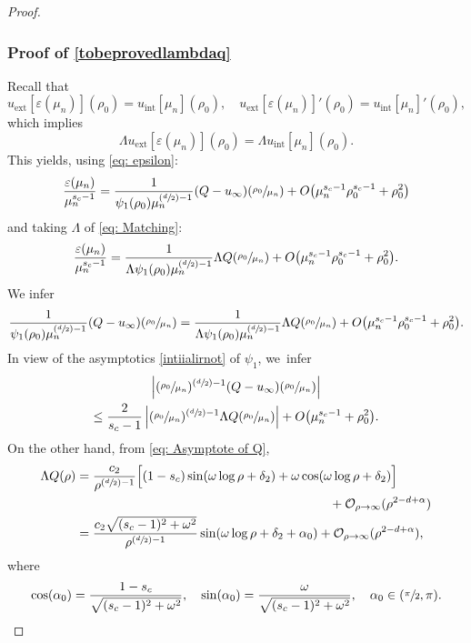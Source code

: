 \documentclass[10pt]{amsart}
\newcommand{\Psfrac}[2]{(\sfrac{#1}{#2})}
\theoremstyle{plain}
\theoremstyle{definition}
\DeclareMathOperator{\exterior}{ext}
\DeclareMathOperator{\interior}{int}
\begin{document}
\begin{proof}
\subsubsection*{Proof of \eqref{tobeprovedlambdaq}}
Recall that
\[
u_{\exterior}[\varepsilon(\mu_n)](\rho_0) = u_{\interior}[\mu_n](\rho_0),\quad u_{\exterior}[\varepsilon(\mu_n)]'(\rho_0) = u_{\interior}[\mu_n]'(\rho_0),
\]
which implies
\[
\Lambda u_{\exterior}[\varepsilon(\mu_n)](\rho_0) = \Lambda u_{\interior}[\mu_n](\rho_0).
\]
This yields, using \eqref{eq: epsilon}:
\[
\frac{\varepsilon(\mu_n)}{\mu_n^{s_c-1}} = \frac{1}{\psi_1(\rho_0)\mu_n^{\Psfrac{d}{2}-1}}(Q-u_\infty)(\sfrac{\rho_0}{\mu_n}) + O\big(\mu_n^{s_c-1}\rho_0^{s_c-1}+\rho_0^2\big)
\]
and taking $\Lambda$ of \eqref{eq: Matching}:
\[
\frac{\varepsilon(\mu_n)}{\mu_n^{s_c-1}} = \frac{1}{\Lambda\psi_1(\rho_0)\mu_n^{\Psfrac{d}{2}-1}}\Lambda Q(\sfrac{\rho_0}{\mu_n}) + O\big(\mu_n^{s_c-1} \rho_0^{s_c-1}+\rho_0^2\big).
\]
We infer
\[
\frac{1}{\psi_1(\rho_0)\mu_n^{\Psfrac{d}{2}-1}}(Q-u_\infty)(\sfrac{\rho_0}{\mu_n}) = \frac{1}{\Lambda\psi_1(\rho_0)\mu_n^{\Psfrac{d}{2}-1}}\Lambda Q(\sfrac{\rho_0}{\mu_n})+ O\big(\mu_n^{s_c-1} \rho_0^{s_c-1}+\rho_0^2\big).
\]
In view of the asymptotics \eqref{intiialirnot} of $\psi_1$, we~infer
\begin{multline}
\label{eq:usefulboundtocountnumberofzeros}
\left|(\sfrac{\rho_0}{\mu_n})^{\Psfrac{d}{2}-1}(Q-u_\infty)(\sfrac{\rho_0}{\mu_n})\right|\\
\leq \frac{2}{s_c-1}\left|(\sfrac{\rho_0}{\mu_n})^{\Psfrac{d}{2}-1}\Lambda Q(\sfrac{\rho_0}{\mu_n})\right|+ O\big(\mu_n^{s_c-1}+\rho_0^2\big).
\end{multline}
On the other hand, from \eqref{eq: Asymptote of Q},
\begin{equation}
\label{eq:equationwithtwostars}
\begin{aligned}
\Lambda Q(\rho)&=\frac{c_2}{ \rho^{\Psfrac{d}{2}-1}}\Big[(1-s_c)\sin(\omega\log\rho+\delta_2)+\omega\cos (\omega\log\rho+\delta_2)\Big]\\
&\hspace*{7cm}+\mathcal O_{\rho\to\infty}(\rho^{2-d+\alpha})\\
&=\frac{c_2\sqrt{(s_c-1)^2+\omega^2}}{ \rho^{\Psfrac{d}{2}-1}}\sin(\omega\log\rho+\delta_2+\alpha_0)+\mathcal O_{\rho\to\infty}(\rho^{2-d+\alpha}),
\end{aligned}
\end{equation}
where
\[
\cos(\alpha_0)=\frac{1-s_c}{\sqrt{(s_c-1)^2+\omega^2}},\quad \sin(\alpha_0)=\frac{\omega}{\sqrt{(s_c-1)^2+\omega^2}},\quad\alpha_0\in(\sfrac{\pi}{2}, \pi).
\]
\end{proof}
\end{document}

